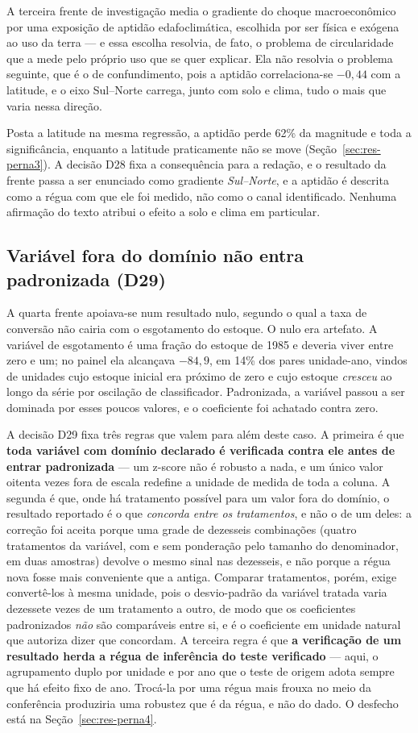 A terceira frente de investigação media o gradiente do choque macroeconômico por
uma exposição de aptidão edafoclimática, escolhida por ser física e exógena ao
uso da terra --- e essa escolha resolvia, de fato, o problema de circularidade
que a mede pelo próprio uso que se quer explicar. Ela não resolvia o problema
seguinte, que é o de confundimento, pois a aptidão correlaciona-se $-0{,}44$ com a
latitude, e o eixo Sul--Norte carrega, junto com solo e clima, tudo o mais que
varia nessa direção.

Posta a latitude na mesma regressão, a aptidão perde 62\% da magnitude e toda
a significância, enquanto a latitude praticamente não se move
(Seção~\ref{sec:res-perna3}). A decisão D28 fixa a consequência para a
redação, e o resultado da frente passa a ser enunciado como gradiente
\emph{Sul--Norte}, e a aptidão é descrita como a régua com que ele foi medido,
não como o canal identificado. Nenhuma afirmação do texto atribui o efeito a
solo e clima em particular.

\subsection{Variável fora do domínio não entra padronizada (D29)}
\label{sec:met-d29}

A quarta frente apoiava-se num resultado nulo, segundo o qual a taxa de conversão não cairia
com o esgotamento do estoque. O nulo era artefato. A variável de esgotamento é uma
fração do estoque de 1985 e deveria viver entre zero e um; no painel ela
alcançava $-84{,}9$, em 14\% dos pares unidade-ano, vindos de unidades cujo
estoque inicial era próximo de zero e cujo estoque \emph{cresceu} ao longo da
série por oscilação de classificador. Padronizada, a variável passou a ser
dominada por esses poucos valores, e o coeficiente foi achatado contra zero.

A decisão D29 fixa três regras que valem para além deste caso. A primeira é que
\textbf{toda variável com domínio declarado é verificada contra ele antes de
entrar padronizada} --- um z-score não é robusto a nada, e um único valor
oitenta vezes fora de escala redefine a unidade de medida de toda a coluna. A
segunda é que, onde há tratamento possível para um valor fora do domínio, o
resultado reportado é o que \emph{concorda entre os tratamentos}, e não o de um
deles: a correção foi aceita porque uma grade de dezesseis combinações (quatro
tratamentos da variável, com e sem ponderação pelo tamanho do denominador, em
duas amostras) devolve o mesmo sinal nas dezesseis, e não porque a régua nova
fosse mais conveniente que a antiga. Comparar tratamentos, porém, exige
convertê-los à mesma unidade, pois o desvio-padrão da variável tratada varia
dezessete vezes de um tratamento a outro, de modo que os coeficientes
padronizados \emph{não} são comparáveis entre si, e é o coeficiente em unidade
natural que autoriza dizer que concordam. A terceira regra é que \textbf{a
verificação de um resultado herda a régua de inferência do teste verificado}
--- aqui, o agrupamento duplo por unidade e por ano que o teste de origem adota
sempre que há efeito fixo de ano. Trocá-la por uma régua mais frouxa no meio da
conferência produziria uma robustez que é da régua, e não do dado. O desfecho
está na Seção~\ref{sec:res-perna4}.


